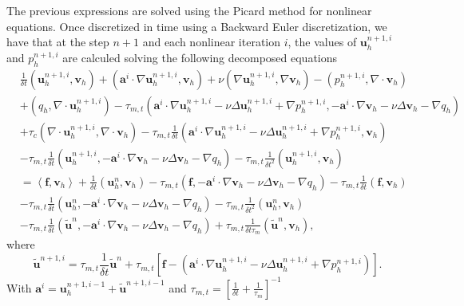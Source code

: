 The previous expressions are solved using the Picard method for nonlinear equations. Once discretized in time using a Backward Euler discretization, we have that at the step $ n+1 $ and each nonlinear iteration $ i $, the values of $ \mathbf{u}_h^{n+1,i} $ and $ p_h^{n+1,i} $ are calculed solving the following decomposed equations
\begin{align}
\label{7}
&\frac{1}{\delta t}(\mathbf{u}_h^{n+1,i},\mathbf{v}_h)+(\mathbf{a}^i\cdot\nabla\mathbf{u}_h^{n+1,i},\mathbf{v}_h)+\nu(\nabla\mathbf{u}_h^{n+1,i},\nabla\mathbf{v}_h)-(p_h^{n+1,i},\nabla\cdot\mathbf{v}_h)\\\nonumber
&+(q_h,\nabla\cdot\mathbf{u}_h^{n+1,i})-\tau_{m,t}(\mathbf{a}^i\cdot\nabla\mathbf{u}_h^{n+1,i}-\nu\Delta\mathbf{u}_h^{n+1,i}+\nabla p_h^{n+1,i},-\mathbf{a}^i\cdot\nabla\mathbf{v}_h-\nu\Delta\mathbf{v}_h-\nabla q_h)\\\nonumber
&+\tau_c(\nabla\cdot\mathbf{u}_h^{n+1,i},\nabla\cdot\mathbf{v}_h)-\tau_{m,t}\frac{1}{\delta t}(\mathbf{a}^i\cdot\nabla\mathbf{u}_h^{n+1,i}-\nu\Delta\mathbf{u}_h^{n+1,i}+\nabla p_h^{n+1,i},\mathbf{v}_h)\\\nonumber
&-\tau_{m,t}\frac{1}{\delta t}(\mathbf{u}_h^{n+1,i},-\mathbf{a}^i\cdot\nabla\mathbf{v}_h-\nu\Delta\mathbf{v}_h-\nabla q_h)-\tau_{m,t}\frac{1}{\delta t^2}(\mathbf{u}_h^{n+1,i},\mathbf{v}_h)\\\nonumber
&=\left<\mathbf{f},\mathbf{v}_h\right>+\frac{1}{\delta t}(\mathbf{u}_h^n,\mathbf{v}_h)-\tau_{m,t}(\mathbf{f},-\mathbf{a}^i\cdot\nabla\mathbf{v}_h-\nu\Delta\mathbf{v}_h-\nabla q_h)-\tau_{m,t}\frac{1}{\delta t}(\mathbf{f},\mathbf{v}_h)\\\nonumber
&-\tau_{m,t}\frac{1}{\delta t}(\mathbf{u}_h^n,-\mathbf{a}^i\cdot\nabla\mathbf{v}_h-\nu\Delta\mathbf{v}_h-\nabla q_h)-\tau_{m,t}\frac{1}{\delta t^2}(\mathbf{u}_h^n,\mathbf{v}_h)\\\nonumber
&-\tau_{m,t}\frac{1}{\delta t}(\tilde{\mathbf{u}}^n,-\mathbf{a}^i\cdot\nabla\mathbf{v}_h-\nu\Delta\mathbf{v}_h-\nabla q_h)+\tau_{m,t}\frac{1}{\delta t\tau_m}(\tilde{\mathbf{u}}^n,\mathbf{v}_h),
\end{align}
where
\begin{equation}
\label{8}
\tilde{\mathbf{u}}^{n+1,i}=\tau_{m,t}\frac{1}{\delta t}\tilde{\mathbf{u}}^n+\tau_{m,t}\left[\mathbf{f}-(\mathbf{a}^i\cdot\nabla\mathbf{u}_h^{n+1,i}-\nu\Delta\mathbf{u}_h^{n+1,i}+\nabla p_h^{n+1,i})\right].
\end{equation}
With $ \mathbf{a}^i=\mathbf{u}_h^{n+1,i-1}+\tilde{\mathbf{u}}^{n+1,i-1} $ and $ \tau_{m,t}=\left[\frac{1}{\delta t}+\frac{1}{\tau_m}\right]^{-1} $

